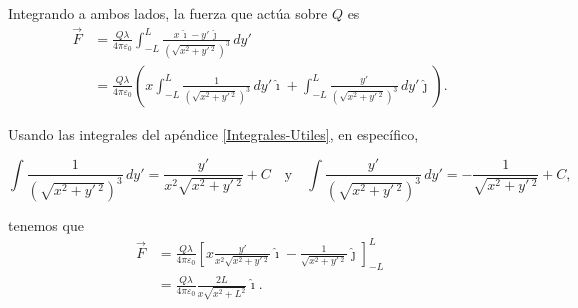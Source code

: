 \begin{ejemplo}
Integrando a ambos lados, la fuerza que actúa sobre $Q$ es
\begin{align*}
    \Vec{F} &= \frac{Q \lambda}{4\pi \varepsilon_0} \int_{-L}^L \frac{x \,\hat{\imath} - y' \,\hat{\jmath}}{(\sqrt{x^2 + y'\,^2})^3}  \,dy' \\
    &= \frac{Q \lambda}{4\pi \varepsilon_0} \left(x \int_{-L}^L \frac{1}{(\sqrt{x^2 + y'\,^2})^3} \,dy' \hat{\imath} + \int_{-L}^{L} \frac{y'}{(\sqrt{x^2+y'\,^2})^3} \,dy' \hat{\jmath} \right).  
\end{align*}

Usando las integrales del apéndice \ref{Integrales-Utiles}, en específico,

\begin{equation*}
\int \frac{1}{(\sqrt{x^2+y'\,^2})^3} \,dy' = \frac{y'}{x^2 \sqrt{x^2+y'\,^2}} + C \quad \text{y} \quad \int \frac{y'}{(\sqrt{x^2+y'\,^2})^3} \,dy' = - \frac{1}{\sqrt{x^2+y'\,^2}} +C,
\end{equation*}

tenemos que 
\begin{align*}
    \Vec{F} &= \frac{Q \lambda}{4\pi \varepsilon_0} \left[ x \frac{y'}{x^2 \sqrt{x^2+y'\,^2}} \hat{\imath} - \frac{1}{\sqrt{x^2+y'\,^2}} \hat{\jmath} \right]_{-L}^{L} \\
    &= \frac{Q \lambda}{4\pi \varepsilon_0} \frac{2L}{x \sqrt{x^2+L^2}} \hat{\imath}.
\end{align*}
\end{ejemplo}

